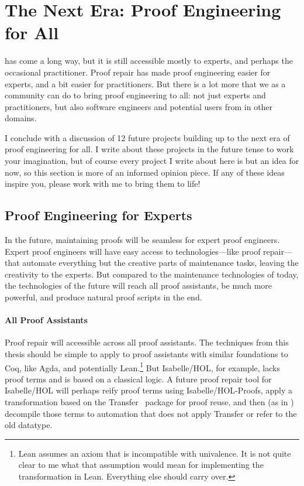\section*{The Next Era: Proof Engineering for All}


 has come a long way, but it is still accessible mostly to experts, and perhaps the occasional practitioner.
Proof repair has made proof engineering easier for experts, and a bit easier for practitioners.
But there is a lot more that we as a community can do to bring proof engineering to all: not just experts and practitioners,
but also software engineers and potential users from in other domains.

I conclude with a discussion of 12 future projects building up to the next era of proof engineering for all.
I write about these projects in the future tense to work your imagination, but of course every project I write about here is but an idea for now,
so this section is more of an informed opinion piece.
If any of these ideas inspire you, please work with me to bring them to life!

\subsection*{Proof Engineering for Experts}

In the future, maintaining proofs will be seamless for expert proof engineers.
Expert proof engineers will have easy access to technologies---like proof repair---that automate everything but the creative parts of maintenance tasks,
leaving the creativity to the experts.
But compared to the maintenance technologies of today, the technologies of the future will reach all proof assistants,
be much more powerful,
and produce natural proof scripts in the end.

\paragraph{All Proof Assistants}
Proof repair will accessible across all proof assistants.
The techniques from this thesis should be simple to apply to proof assistants with similar foundations to Coq, like Agda,
and potentially Lean.\footnote{Lean assumes an axiom that is incompatible with univalence.
It is not quite clear to me what that assumption would mean for implementing the \toolnamec transformation in Lean.
Everything else should carry over.}
But Isabelle/HOL, for example, lacks proof terms and is based on a classical logic.
A future proof repair tool for Isabelle/HOL will perhaps reify proof terms using
Isabelle/HOL-Proofs, apply a transformation based on the Transfer~\cite{Huffman2013} package for proof reuse, and then (as in \toolnamec) decompile those terms to automation that does 
not apply Transfer or refer to the old datatype.


